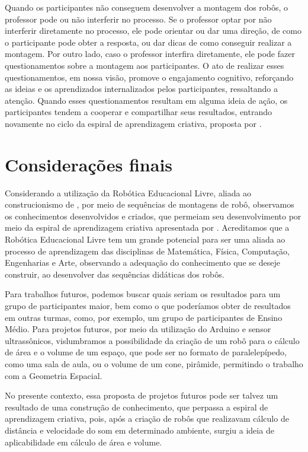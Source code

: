 \documentclass{textolivre}
\begin{document}
Quando os participantes não conseguem desenvolver a montagem dos robôs, o professor pode ou não interferir no processo. Se o professor optar por não interferir diretamente no processo, ele pode orientar ou dar uma direção, de como o participante pode obter a resposta, ou dar dicas de como conseguir realizar a montagem. Por outro lado, caso o professor interfira diretamente, ele pode fazer questionamentos sobre a montagem aos participantes. O ato de realizar esses questionamentos, em nossa visão, promove o engajamento cognitivo, reforçando as ideias e os aprendizados internalizados pelos participantes, ressaltando a atenção. Quando esses questionamentos resultam em alguma ideia de ação, os participantes tendem a cooperar e compartilhar seus resultados, entrando novamente no ciclo da espiral de aprendizagem criativa, proposta por \textcite{resnick2020}.

\section{Considerações finais}\label{sec-5}
Considerando a utilização da Robótica Educacional Livre, aliada ao construcionismo de \textcite{papert1980, papert2008}, por meio de sequências de montagens de robô, observamos os conhecimentos desenvolvidos e criados, que permeiam seu desenvolvimento por meio da espiral de aprendizagem criativa  apresentada por \textcite{resnick2020}. Acreditamos que a Robótica Educacional Livre tem um grande potencial para ser uma aliada ao processo de aprendizagem  das disciplinas de Matemática, Física, Computação, Engenharias e Arte, observando a adequação do conhecimento que se deseje construir, ao desenvolver das sequências didáticas dos robôs.

Para trabalhos futuros, podemos buscar quais seriam os resultados para um grupo de participantes maior, bem como o que poderíamos obter de resultados em outras turmas, como, por exemplo, um grupo de participantes de Ensino Médio. Para projetos futuros, por meio da utilização do Arduino e sensor ultrassônicos, vislumbramos a possibilidade da criação de um robô para o cálculo de área e o volume de um espaço, que pode ser no formato de paralelepípedo, como uma sala de aula, ou o volume de um cone, pirâmide, permitindo o trabalho com a Geometria Espacial.

No presente contexto, essa proposta de projetos futuros pode ser talvez um resultado de uma construção de conhecimento, que perpassa a espiral de aprendizagem criativa, pois,  após a criação de robôs que realizavam cálculo de distância e velocidade do som em determinado ambiente,  surgiu a ideia de aplicabilidade em cálculo de área e volume.
\end{document}
